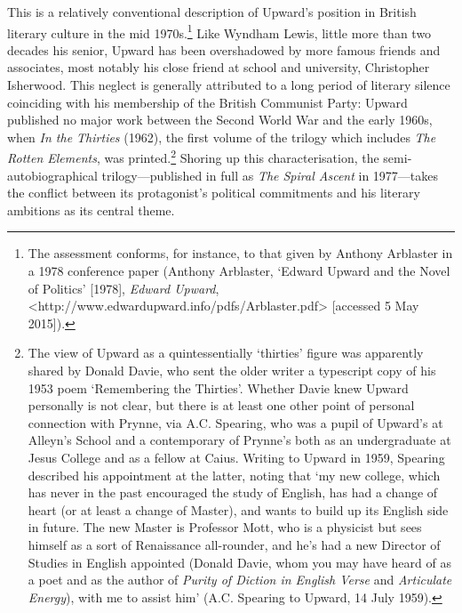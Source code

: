 \documentclass[]{article}
\begin{document}
\noindent This is a relatively conventional description of Upward's
position in British literary culture in the mid 1970s.\footnote{The
  assessment conforms, for instance, to that given by Anthony Arblaster
  in a 1978 conference paper (Anthony Arblaster, `Edward Upward and the
  Novel of Politics' {[}1978{]}, \emph{Edward Upward},
  \textless{}http://www.edwardupward.info/pdfs/Arblaster.pdf\textgreater{}
  {[}accessed 5 May 2015{]}).} Like Wyndham Lewis, little more than two
decades his senior, Upward has been overshadowed by more famous friends
and associates, most notably his close friend at school and university,
Christopher Isherwood. This neglect is generally attributed to a long
period of literary silence coinciding with his membership of the British
Communist Party: Upward published no major work between the Second World
War and the early 1960s, when \emph{In the Thirties} (1962), the first
volume of the trilogy which includes \emph{The Rotten Elements}, was
printed.\footnote{The view of Upward as a quintessentially `thirties'
  figure was apparently shared by Donald Davie, who sent the older
  writer a typescript copy of his 1953 poem `Remembering the Thirties'.
  Whether Davie knew Upward personally is not clear, but there is at
  least one other point of personal connection with Prynne, via A.C.
  Spearing, who was a pupil of Upward's at Alleyn's School and a
  contemporary of Prynne's both as an undergraduate at Jesus College and
  as a fellow at Caius. Writing to Upward in 1959, Spearing described
  his appointment at the latter, noting that `my new college, which has
  never in the past encouraged the study of English, has had a change of
  heart (or at least a change of Master), and wants to build up its
  English side in future. The new Master is Professor Mott, who is a
  physicist but sees himself as a sort of Renaissance all-rounder, and
  he's had a new Director of Studies in English appointed (Donald Davie,
  whom you may have heard of as a poet and as the author of \emph{Purity
  of Diction in English Verse} and \emph{Articulate Energy}), with me to
  assist him' (A.C. Spearing to Upward, 14 July 1959).} Shoring up this
characterisation, the semi-autobiographical trilogy---published in full
as \emph{The Spiral Ascent} in 1977---takes the conflict between its
protagonist's political commitments and his literary ambitions as its
central theme.
\end{document}
